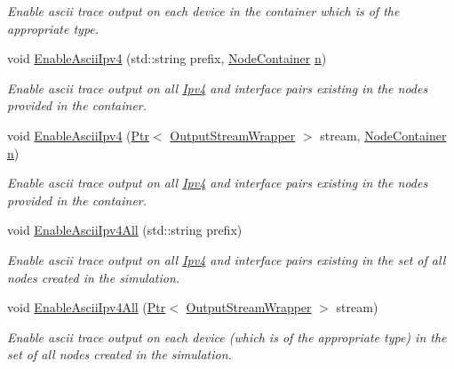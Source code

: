 \begin{DoxyCompactItemize}
\begin{DoxyCompactList}\small\item\em Enable ascii trace output on each device in the container which is of the appropriate type. \end{DoxyCompactList}\item 
void \hyperlink{classns3_1_1AsciiTraceHelperForIpv4_a3e06e4b9df0ae430d39c3ae17ab47b26}{Enable\+Ascii\+Ipv4} (std\+::string prefix, \hyperlink{classns3_1_1NodeContainer}{Node\+Container} \hyperlink{lte__link__budget__x2__handover__measures_8m_abdb05bc5a064cf642a06c83b3392f148}{n})
\begin{DoxyCompactList}\small\item\em Enable ascii trace output on all \hyperlink{classns3_1_1Ipv4}{Ipv4} and interface pairs existing in the nodes provided in the container. \end{DoxyCompactList}\item 
void \hyperlink{classns3_1_1AsciiTraceHelperForIpv4_a8fbac4a6807252e0b9e0b81ca2937e15}{Enable\+Ascii\+Ipv4} (\hyperlink{classns3_1_1Ptr}{Ptr}$<$ \hyperlink{classns3_1_1OutputStreamWrapper}{Output\+Stream\+Wrapper} $>$ stream, \hyperlink{classns3_1_1NodeContainer}{Node\+Container} \hyperlink{lte__link__budget__x2__handover__measures_8m_abdb05bc5a064cf642a06c83b3392f148}{n})
\begin{DoxyCompactList}\small\item\em Enable ascii trace output on all \hyperlink{classns3_1_1Ipv4}{Ipv4} and interface pairs existing in the nodes provided in the container. \end{DoxyCompactList}\item 
void \hyperlink{classns3_1_1AsciiTraceHelperForIpv4_a848f30badae7f28c5c20533f49de34bb}{Enable\+Ascii\+Ipv4\+All} (std\+::string prefix)
\begin{DoxyCompactList}\small\item\em Enable ascii trace output on all \hyperlink{classns3_1_1Ipv4}{Ipv4} and interface pairs existing in the set of all nodes created in the simulation. \end{DoxyCompactList}\item 
void \hyperlink{classns3_1_1AsciiTraceHelperForIpv4_a65b80833cb91b45709c53d5bb6afc33b}{Enable\+Ascii\+Ipv4\+All} (\hyperlink{classns3_1_1Ptr}{Ptr}$<$ \hyperlink{classns3_1_1OutputStreamWrapper}{Output\+Stream\+Wrapper} $>$ stream)
\begin{DoxyCompactList}\small\item\em Enable ascii trace output on each device (which is of the appropriate type) in the set of all nodes created in the simulation. \end{DoxyCompactList}\item 

\end{DoxyCompactItemize}
